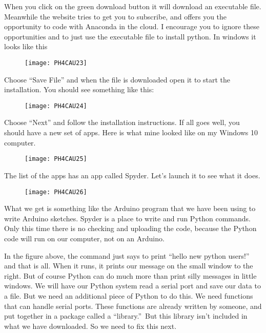 When you click on the green download button it will download an executable file. Meanwhile the website tries to get you to subscribe, and offers you the opportunity to code with Anaconda in the cloud. I encourage you to ignore these opportunities and to just use the executable file to install python. In windows it looks like this 

\begin{figure}[h!]
	\centering
	\texttt{[image: PH4CAU23]}
\end{figure}

Choose ``Save File'' and when the file is downloaded open it to start the installation. You should see something like this: 

\begin{figure}[h!]
	\centering
	\texttt{[image: PH4CAU24]}
\end{figure}

Choose ``Next'' and follow the installation instructions. If all goes well, you should have a new set of apps. Here is what mine looked like on my Windows 10 computer. 

\begin{figure}[h!]
	\centering
	\texttt{[image: PH4CAU25]}
\end{figure}

The list of the apps has an app called Spyder. Let's launch it to see what it does.

\begin{figure}[h!]
	\centering
	\texttt{[image: PH4CAU26]}
\end{figure}

What we get is something like the Arduino program that we have been using to write Arduino sketches. Spyder is a place to write and run Python commands. Only this time there is no checking and uploading the code, because the Python code will run on our computer, not on an Arduino.

In the figure above, the command just says to print ``hello new python users!'' and that is all. When it runs, it prints our message on the small window to the right. But of course Python
can do much more than print silly messages in little windows. We will have our Python system read a serial port and save our data to a file. But we need an additional piece of Python to do this. We need functions that can handle serial ports. These functions are already written by someone, and put together in a package called a \textquotedblleft library.\textquotedblright\
But this library isn't included in what we have downloaded. So we need to fix this next.

